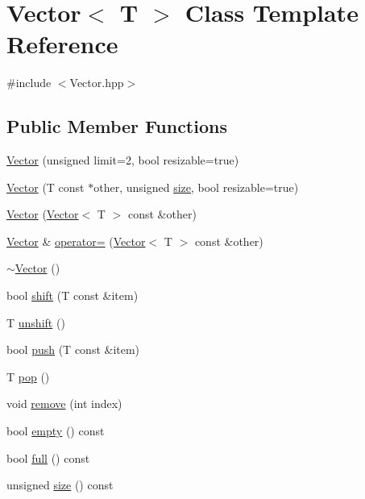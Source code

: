 \hypertarget{classVector}{}\section{Vector$<$ T $>$ Class Template Reference}
\label{classVector}


{\ttfamily \#include $<$Vector.\+hpp$>$}

\subsection*{Public Member Functions}
\begin{DoxyCompactItemize}
\item 
\hyperlink{classVector_a2d2738e562188d3c4e08c3fc7075dc0a}{Vector} (unsigned limit=2, bool resizable=true)
\item 
\hyperlink{classVector_a363b28b2093e32cb4ee93148c065782b}{Vector} (T const $\ast$other, unsigned \hyperlink{classVector_a7eef7a769093f4486f3b2083436bf270}{size}, bool resizable=true)
\item 
\hyperlink{classVector_a857e13a3af4fb6e3eea77935cfcd4ef2}{Vector} (\hyperlink{classVector}{Vector}$<$ T $>$ const \&other)
\item 
\hyperlink{classVector}{Vector} \& \hyperlink{classVector_a0feef299594680034402e23ff28b9f45}{operator=} (\hyperlink{classVector}{Vector}$<$ T $>$ const \&other)
\item 
\hyperlink{classVector_afd524fac19e6d3d69db5198ffe2952b0}{$\sim$\+Vector} ()
\item 
bool \hyperlink{classVector_adb54584983bf6750f60d5ad375f6c603}{shift} (T const \&item)
\item 
T \hyperlink{classVector_a4fda2f9168cac24815062130bada9a8d}{unshift} ()
\item 
bool \hyperlink{classVector_ad15116a272b1924dc11e3543a8fc95d8}{push} (T const \&item)
\item 
T \hyperlink{classVector_aef4a3e10a9844ea17cdd89cee17e495a}{pop} ()
\item 
void \hyperlink{classVector_abc1ce95078c61fd5826583b0de7279b4}{remove} (int index)
\item 
bool \hyperlink{classVector_ad688a8a0dfbd07ea63d838058a436f79}{empty} () const
\item 
bool \hyperlink{classVector_a31a67e97a324510bff15ea79c64839af}{full} () const
\item 
unsigned \hyperlink{classVector_a7eef7a769093f4486f3b2083436bf270}{size} () const
\item 

\end{DoxyCompactItemize}
